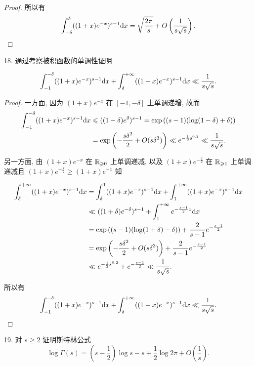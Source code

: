 \begin{proof}
	所以有 $$\int_{-\delta}^{\delta}((1+x)e^{-x})^{s-1} \text {d} x = \sqrt{\frac{2\pi}{s}}+O\left(\frac{1}{s\sqrt{s}}\right).$$

\end{proof}

18. 通过考察被积函数的单调性证明

$$\int_{-1}^{-\delta}((1+x)e^{-x})^{s-1} \text {d} x + \int_{\delta}^{+\infty}((1+x)e^{-x})^{s-1}\text {d} x \ll \frac{1}{s\sqrt{s}}.$$

\begin{proof}
	一方面, 因为 $(1+x)e^{-x}$ 在 $[-1,-\delta]$ 上单调递增, 故而
	\begin{equation}\label{欧拉积分2}
		\begin{aligned}
			\int_{-1}^{-\delta} ((1+x)e^{-x})^{s-1} \text {d} x &\leqslant ((1-\delta)e^\delta)^{s-1} = \exp\left((s-1)(\log(1-\delta)+\delta)\right) \\
			&= \exp\left(-\frac{s\delta^2}{2}+O(s\delta^3)\right) \ll e^{-\frac{1}{2}s^{0.2}} \ll \frac{1}{s\sqrt{s}}.
		\end{aligned}
	\end{equation}

	另一方面, 由 $(1+x)e^{-x}$ 在 $\mathbb {R}_{\geqslant 0}$ 上单调递减, 以及 $(1+x)e^{-\frac{x}{2}}$ 在 $\mathbb {R}_{\geqslant 1}$ 上单调递减且 $(1+x)e^{-\frac{x}{2}} \geqslant (1+x)e^{-x}$ 知

	\begin{equation}\label{欧拉积分3}
		\begin{aligned}
			\int_{\delta}^{+\infty} ((1+x)e^{-x})^{s-1} \text {d} x &= \int_{\delta}^1 ((1+x)e^{-x})^{s-1} \text {d} x + \int_{1}^{+\infty} ((1+x)e^{-x})^{s-1} \text {d} x \\
			&\ll ((1+\delta)e^{-\delta})^{s-1} + \int_{1}^{+\infty} e^{-\frac{s-1}{2}x} \text {d} x \\
			&= \exp\left((s-1)(\log(1+\delta)-\delta)\right) + \frac{2}{s-1}e^{-\frac{s-1}{2}} \\
			&= \exp\left(-\frac{s\delta^2}{2} + O(s\delta^3)\right) + \frac{2}{s-1}e^{-\frac{s-1}{2}} \\
			&\ll e^{-\frac{1}{2}s^{0.2}} + e^{-\frac{s-1}{2}} \ll \frac{1}{s\sqrt{s}}.
		\end{aligned}
	\end{equation}

	所以有 $$\int_{-1}^{-\delta}((1+x)e^{-x})^{s-1} \text {d} x + \int_{\delta}^{+\infty}((1+x)e^{-x})^{s-1}\text {d} x \ll \frac{1}{s\sqrt{s}}.$$
\end{proof}

19. 对 $s \geqslant 2$ 证明斯特林公式
$$\log\Gamma(s) = (s-\frac{1}{2})\log s - s +\frac{1}{2}\log{2\pi}+O\left(\frac{1}{s}\right).$$

